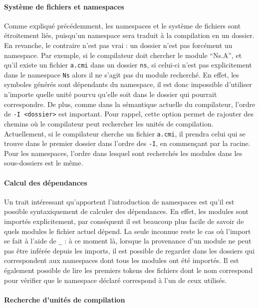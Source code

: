 \documentclass[11pt,a4paper]{report}
\begin{document}
\paragraph{Système de fichiers et namespaces}

Comme expliqué précédemment, les namespaces et le système de fichiers sont
étroitement liés, puisqu'un namespace sera traduit à la compilation en un
dossier. En revanche, le contraire n'est pas vrai : un dossier n'est pas
forcément un namespace. Par exemple, si le compilateur doit chercher le module
``Ns.A'', et qu'il existe un fichier \texttt{a.cmi} dans un dossier \texttt{ns},
si celui-ci n'est pas explicitement dans le namespace \texttt{Ns} alors il ne
s'agit pas du module recherché. En effet, les symboles générés sont dépendants
du namespace, il est donc impossible d'utiliser n'importe quelle unité pourvu
qu'elle soit dans le dossier qui pourrait correspondre. De plus, comme dans la
sémantique actuelle du compilateur, l'ordre de \texttt{-I <dossier>} est
important. Pour rappel, cette option permet de rajouter des chemins où le
compilateur peut rechercher les unités de compilation. Actuellement, si le
compilateur cherche un fichier \texttt{a.cmi}, il prendra celui qui se trouve
dans le premier dossier dans l'ordre des \texttt{-I}, en commençant par la
racine. Pour les namespaces, l'ordre dans lesquel sont recherchés les modules
dans les sous-dossiers est le même.

\paragraph{Calcul des dépendances}

Un trait intéressant qu'apportent l'introduction de namespaces est qu'il est
possible syntaxiquement de calculer des dépendances. En effet, les modules sont
importés explicitement, par conséquent il est beaucoup plus facile de savoir de
quels modules le fichier actuel dépend. La seule inconnue reste le cas où
l'import se fait à l'aide de \texttt{_} : à ce moment là, lorsque la provenance
d'un module ne peut pas être inférée depuis les imports, il est possible de
regarder dans les dossiers qui correspondent aux namespaces dont tous les
modules ont été importés. Il est également possible de lire les premiers tokens
des fichiers dont le nom correspond pour vérifier que le namespace déclaré
correspond à l'un de ceux utilisés.

\paragraph{Recherche d'unités de compilation}
\end{document}
